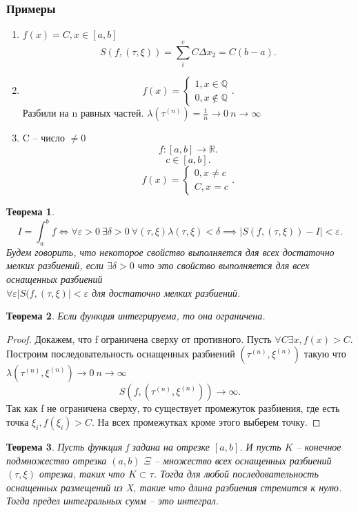 \documentclass{scrartcl}
\newtheorem{theorem}{Теорема}
\begin{document}
\subsubsection{Примеры}
\begin{enumerate}
    \item $f(x) =  C, x \in [a,b]$
         \[
        S(f,(\tau,\xi)) = \sum_{i}^{c} C \Delta x_{2} = C(b - a)
        .\] 
    \item 
        \[
            f(x) = 
            \begin{cases}
                1 , x \in \mathbb{Q}\\
                0, x \notin \mathbb{Q}
            \end{cases}
        .\] 
        Разбили на n равных частей. $\lambda(\tau^{(n)}) = \frac{1}{n} \to 0 ~ n  \to \infty$
    \item C -- число $\neq 0$
        \[
            f:[a,b] \to \mathbb{R}
        .\] 
        \[
            c \in [a,b]
        .\] 
        \[
        f(x) = 
        \begin{cases}
            0, x \neq c\\
            C, x = c
        \end{cases}
        .\] 
\end{enumerate}
\begin{theorem}
    \[
    I = \int_{a}^{b} f \iff
    \forall \varepsilon > 0 ~ \exists  \delta > 0 ~ \forall (\tau,\xi)
    \lambda(\tau,\xi) < \delta \implies |S(f,(\tau,\xi)) - I| < \varepsilon
    .\] 
    Будем говорить, что некоторое свойство выполняется для всех достаточно мелких разбиений, если $\exists  \delta >0 $ что это свойство выполняется для всех оснащенных разбиений\\
    $\forall  \varepsilon |S(f,(\tau,\xi)| < \varepsilon$ для достаточно мелких разбиений.
\end{theorem}
\begin{theorem}
    Если функция интегрируема, то она ограничена.
\end{theorem}
\begin{proof}
    Докажем, что f ограничена сверху от противного. Пусть $\forall  C \exists  x, 
    f(x) > C$. Построим последовательность оснащенных разбиений $(\tau^{(n)},\xi^{(n)})$ такую что $\lambda(\tau^{(n)},\xi^{(n)}) \to 0 ~n \to \infty$ 
    \[
    S(f,(\tau^{(n)},\xi^{(n)})) \to \infty
    .\] 
    Так как f не ограничена сверху, то  существует промежуток разбиения, где есть точка $\xi_{i}, f(\xi_{i}) > C$. На всех промежутках кроме этого выберем точку.
\end{proof}
\begin{theorem}
    Пусть функция f задана на отрезке $[a,b]$. И пусть  $K$ -- конечное подмножество отрезка  $(a,b)$ $\Xi$ -- множество всех оснащенных разбиений $(\tau, \xi)$ отрезка, 
    таких что  $K \subset \tau$.
    Тогда для любой последовательность оснащенных размещений из X, такие что длина разбиения стремится к нулю. Тогда предел интегральных сумм -- это интеграл.
\end{theorem}
\end{document}
